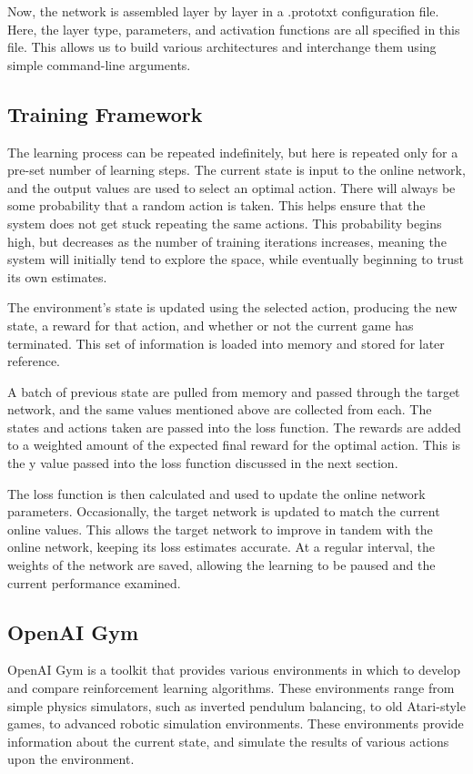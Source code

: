 \documentclass{article}
\begin{document}
Now, the network is assembled layer by layer in a .prototxt configuration file. Here, the layer type, parameters, and activation functions are all specified in this file. This allows us to build various architectures and interchange them using simple command-line arguments.

\subsection{Training Framework}

The learning process can be repeated indefinitely, but here is repeated only for a pre-set number of learning steps. The current state is input to the online network, and the output values are used to select an optimal action. There will always be some probability that a random action is taken. This helps ensure that the system does not get stuck repeating the same actions. This probability begins high, but decreases as the number of training iterations increases, meaning the system will initially tend to explore the space, while eventually beginning to trust its own estimates.

The environment's state is updated using the selected action, producing the new state, a reward for that action, and whether or not the current game has terminated. This set of information is loaded into memory and stored for later reference.

A batch of previous state are pulled from memory and passed through the target network, and the same values mentioned above are collected from each. The states and actions taken are passed into the loss function. The rewards are added to a weighted amount of the expected final reward for the optimal action. This is the y value passed into the loss function discussed in the next section. 

The loss function is then calculated and used to update the online network parameters. Occasionally, the target network is updated to match the current online values. This allows the target network to improve in tandem with the online network, keeping its loss estimates accurate. At a regular interval, the weights of the network are saved, allowing the learning to be paused and the current performance examined.

\subsection{OpenAI Gym}

OpenAI Gym is a toolkit that provides various environments in which to develop and compare reinforcement learning algorithms. These environments range from simple physics simulators, such as inverted pendulum balancing, to old Atari-style games, to advanced robotic simulation environments. These environments provide information about the current state, and simulate the results of various actions upon the environment.
\end{document}
